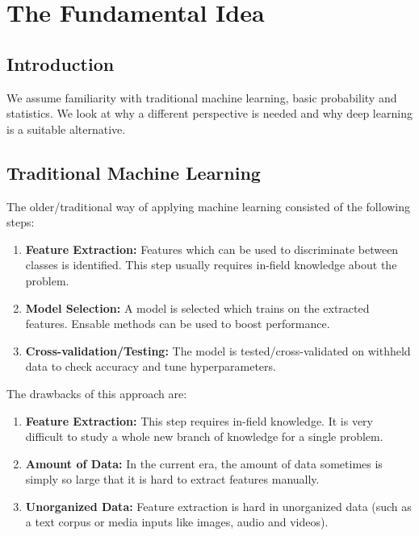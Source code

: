 \chapter{The Fundamental Idea}
\section{Introduction}
We assume familiarity with traditional machine learning, basic probability and statistics. We look at why a different perspective
is needed and why deep learning is a suitable alternative.

\section{Traditional Machine Learning}
The older/traditional way of applying machine learning consisted of the following steps:
\begin{enumerate}
    \item \textbf{Feature Extraction:} Features which can be used to discriminate between classes is identified. This step usually requires in-field knowledge about the problem.
    \item \textbf{Model Selection: } A model is selected which trains on the extracted features. Ensable
    methods can be used to boost performance.
    \item \textbf{Cross-validation/Testing: }The model is tested/cross-validated on withheld data to check accuracy and tune hyperparameters.
\end{enumerate}
The drawbacks of this approach are:
\begin{enumerate}
    \item \textbf{Feature Extraction: }This step requires in-field knowledge. It is very difficult to study a
    whole new branch of knowledge for a single problem.
    \item \textbf{Amount of Data: }In the current era, the amount of data sometimes is simply so large
    that it is hard to extract features manually.
    \item \textbf{Unorganized Data: } Feature extraction is hard in unorganized data (such as a text corpus or media inputs like images, audio and videos).
\end{enumerate}
